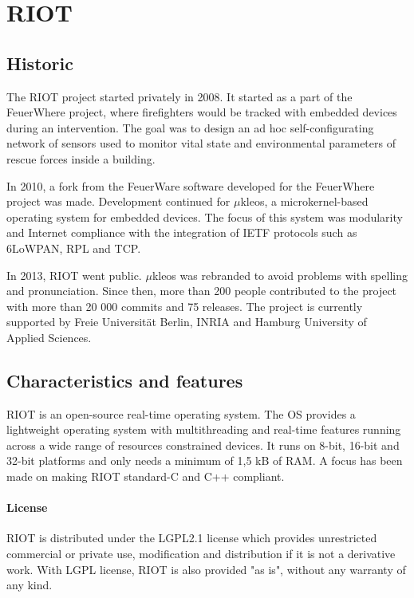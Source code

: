 \section{RIOT}

\subsection{Historic}

The RIOT project started privately in 2008.
It started as a part of the FeuerWhere project\cite{FeuerWhere}, 
    where firefighters would be tracked with embedded devices during an intervention.
The goal was to design an ad hoc self-configurating network of sensors used 
    to monitor vital state and environmental parameters of rescue forces inside a building.

In 2010, a fork from the FeuerWare software developed for the FeuerWhere project was made.
Development continued for $\mu$kleos\cite{microkleos}, a microkernel-based operating system for embedded devices.
The focus of this system was modularity and Internet compliance with the integration of IETF protocols such as 6LoWPAN, RPL and TCP.

In 2013, RIOT went public.
$\mu$kleos was rebranded to avoid problems with spelling and pronunciation.
Since then, more than 200 people contributed to the project with more than 20 000 commits and 75 releases.
The project is currently supported by Freie Universität Berlin, INRIA and Hamburg University of Applied Sciences.

\subsection{Characteristics and features}
RIOT is an open-source real-time operating system.
The OS provides a lightweight operating system with multithreading and real-time features running across a wide range of resources constrained devices.
It runs on 8-bit, 16-bit and 32-bit platforms and only needs a minimum of 1,5 kB of RAM.
A focus has been made on making RIOT standard-C and C++ compliant.

\paragraph{License} RIOT is distributed under the LGPL2.1 license which provides unrestricted commercial or private use, modification and distribution if it is not a derivative work.
With LGPL license, RIOT is also provided "as is", without any warranty of any kind.

